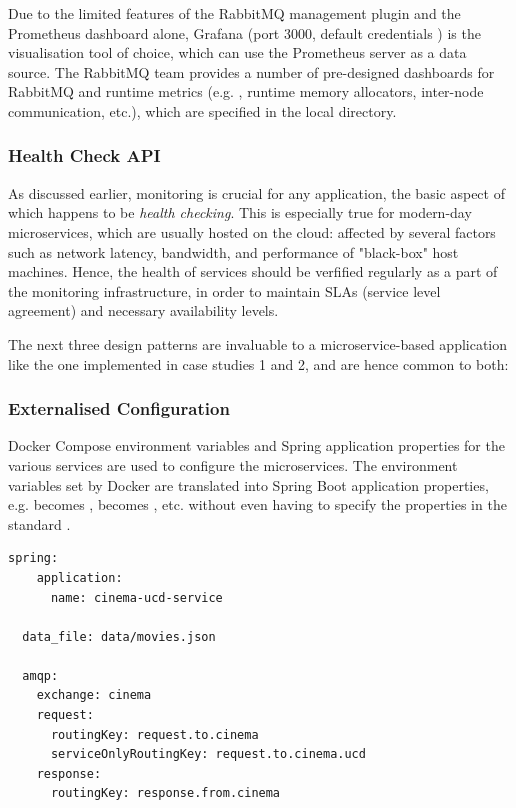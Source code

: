 Due to the limited features of the RabbitMQ management plugin and the Prometheus dashboard alone, Grafana (port 3000, default credentials ) is the visualisation tool of choice, which can use the Prometheus server as a data source. The RabbitMQ team provides a number of pre-designed dashboards for RabbitMQ and runtime metrics (e.g. , runtime memory allocators, inter-node communication, etc.), which are specified in the local  directory.


\subsubsection{Health Check API}

As discussed earlier, monitoring is crucial for any application, the basic aspect of which happens to be \textit{health checking}. This is especially true for modern-day microservices, which are usually hosted on the cloud: affected by several factors such as network latency, bandwidth, and performance of "black-box" host machines. Hence, the health of services should be verfified regularly as a part of the monitoring infrastructure, in order to maintain SLAs (service level agreement) and necessary availability levels.


The next three design patterns are invaluable to a microservice-based application like the one implemented in case studies 1 and 2, and are hence common to both:

\subsubsection{Externalised Configuration}

Docker Compose environment variables and Spring application properties for the various services are used to configure the microservices. The environment variables set by Docker are translated into Spring Boot application properties, e.g.  becomes ,  becomes , etc. without even having to specify the properties in the standard .

\begin{lstlisting}[caption=UCD cinema's \code{application.yml}]
  spring:
    application:
      name: cinema-ucd-service

  data_file: data/movies.json

  amqp:
    exchange: cinema
    request:
      routingKey: request.to.cinema
      serviceOnlyRoutingKey: request.to.cinema.ucd
    response:
      routingKey: response.from.cinema
\end{lstlisting}

